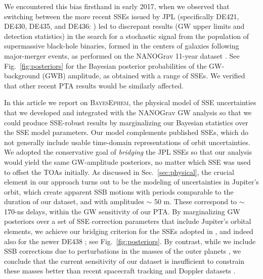 \documentclass[iop,apj,twocolappendix]{emulateapj}
\begin{document}
We encountered this bias firsthand in early 2017, when we observed that switching between the more recent SSEs issued by JPL (specifically DE421, DE430, DE435, and DE436: \citealt{2009IPNPR.178C...1F,2014IPNPR.196C...1F,de435,de436}) led to discrepant results (GW upper limits and detection statistics) in the search for a stochastic signal from the population of supermassive black-hole binaries, formed in the centers of galaxies following major-merger events, as performed on the NANOGrav 11-year dataset \citep{2018ApJS..235...37A,2018ApJ...859...47A}.
See Fig.\ \ref{fig:posteriors} for the Bayesian posterior probabilities of the GW-background (GWB) amplitude, as obtained with a range of SSEs. We verified that other recent PTA results \citep{2015Sci...349.1522S,2016ApJ...821...13A} would be similarly affected.

In this article we report on \textsc{BayesEphem}, the physical model of SSE uncertainties that we developed and integrated with the NANOGrav GW analysis so that we could produce SSE-robust results \citep{2018ApJ...859...47A} by marginalizing our Bayesian statistics over the SSE model parameters. 
Our model complements published SSEs, which do not generally include usable time-domain representations of orbit uncertainties.
We adopted the conservative goal of \emph{bridging} the JPL SSEs so that our analysis would yield the same GW-amplitude posteriors, no matter which SSE was used to offset the TOAs initially.
As discussed in Sec.\ \ref{sec:physical}, the crucial element in our approach turns out to be the modeling of uncertainties in Jupiter's orbit, which create apparent SSB motions with periods comparable to the duration of our dataset, and with amplitudes $\sim$ 50 m. These correspond to $\sim$ 170-ns delays, within the GW sensitivity of our PTA.
By marginalizing GW posteriors over a set of SSE correction parameters that include Jupiter's orbital elements, we achieve our bridging criterion for the SSEs adopted in \cite{2018ApJ...859...47A}, and indeed also for the newer DE438 \citep{de438}; see Fig.\ \ref{fig:posteriors}.
By contrast, while we include SSB corrections due to perturbations in the masses of the outer planets \citep{2010ApJ...720L.201C}, we conclude that the current sensitivity of our dataset is insufficient to constrain these masses better than recent spacecraft tracking and Doppler datasets \citep{jh+2000,2018MNRAS.481.5501C,2006AJ....132.2520J,2014AJ....148...76J,2009AJ....137.4322J}.
\end{document}
